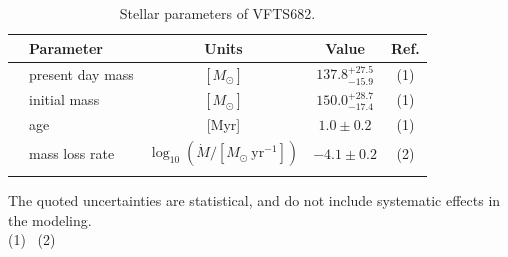 \documentclass[a4paper,fleqn,usenatbib]{mnras}
\begin{document}
\begin{table}
  \begin{center}
    \caption{Stellar parameters of VFTS682. }
    \begin{tabular}{llc|c|c}
      \hline
      \hline
      &Parameter & Units & Value & Ref.\\
     
       \hline
     & present day mass  & $[M_\odot]$ & $137.8^{+27.5}_
                                           {-15.9}$ & (1)
                                                    \\
      & initial mass& $[M_\odot]$ & $150.0^{+28.7}_{-17.4}$ & (1)
      \\
      &age & [Myr] & $1.0\pm0.2$ & (1) \\
      & mass loss rate & $\log_{10}(\dot{M}/[M_\odot \ \mathrm{yr}^{-1}])$ & $-4.1\pm0.2$ & (2)\\
      \hline
      \label{tab:star_param}
    \end{tabular}
      The quoted uncertainties are statistical, and do not include systematic
      effects in the modeling.\\
      (1)~\cite{schneider:18}
      (2)~\cite{bestenlehner:11}
  \end{center}
\end{table}
\end{document}
